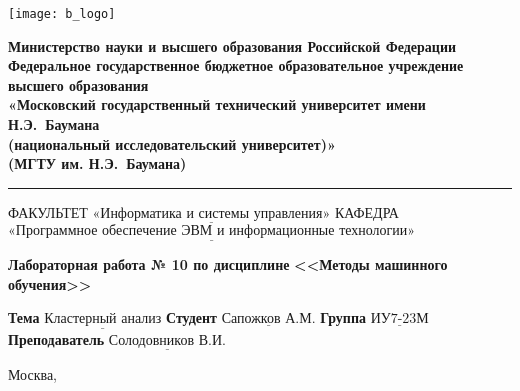 \thispagestyle{empty}

\noindent \begin{minipage}{0.15\textwidth}
	\texttt{[image: b\_logo]}
\end{minipage}
\noindent\begin{minipage}{0.85\textwidth}\centering
	\textbf{Министерство науки и высшего образования Российской Федерации}\\
	\textbf{Федеральное государственное бюджетное образовательное учреждение высшего образования}\\
	\textbf{«Московский государственный технический университет имени Н.Э.~Баумана}\\
	\textbf{(национальный исследовательский университет)»}\\
	\textbf{(МГТУ им. Н.Э.~Баумана)}
\end{minipage}

\noindent\rule{\linewidth}{3pt}
\newline\newline
\noindent ФАКУЛЬТЕТ $\underline{\text{«Информатика и системы управления»}}$ \newline\newline
\noindent КАФЕДРА $\underline{\text{«Программное обеспечение ЭВМ и информационные технологии»}}$

\vspace{1cm}

\begin{center}
	\noindent\begin{minipage}{1.3\textwidth}\centering
		\Large\textbf{  Лабораторная работа № 10 по дисциплине}\newline
		\textbf{<<Методы машинного обучения>>}\newline
	\end{minipage}
\end{center}

\noindent\textbf{Тема} $\underline{\text{Кластерный анализ}}$\newline\newline
\noindent\textbf{Студент} $\underline{\text{Сапожков А.М.}}$\newline\newline
\noindent\textbf{Группа} $\underline{\text{ИУ7-23М}}$\newline\newline
\noindent\textbf{Преподаватель} $\underline{\text{Солодовников В.И.}}$\newline

\begin{center}
	\vfill
	Москва,~\the\year
\end{center}
\clearpage
